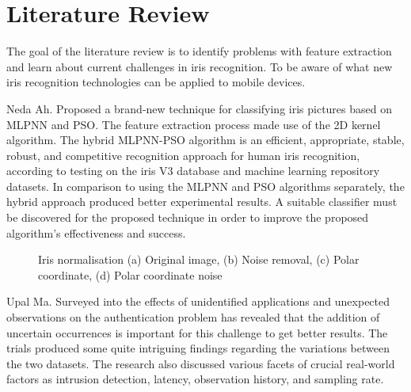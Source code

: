 \documentclass[9pt,twocolumn,twoside]{osajnl}
\begin{document}
\section{Literature Review}
The goal of the literature review is to identify problems with feature extraction and learn about current challenges in iris recognition. To be aware of what new iris recognition technologies can be applied to mobile devices.

Neda Ah. \cite{Chitimalla:17} Proposed a brand-new technique for classifying iris pictures based on MLPNN and PSO. The feature extraction process made use of the 2D kernel algorithm. The hybrid MLPNN-PSO algorithm is an efficient, appropriate, stable, robust, and competitive recognition approach for human iris recognition, according to testing on the iris V3 database and machine learning repository datasets. In comparison to using the MLPNN and PSO algorithms separately, the hybrid approach produced better experimental results. A suitable classifier must be discovered for the proposed technique in order to improve the proposed algorithm's effectiveness and success.

\begin{figure}[htbp]
\centering
{}
\caption{Iris normalisation (a) Original image, (b) Noise removal, (c) Polar coordinate, (d) Polar coordinate noise}
\label{fig:Iris normalisation}
\end{figure}

Upal Ma. \cite{Wen:16} Surveyed into the effects of unidentified applications and unexpected observations on the authentication problem has revealed that the addition of uncertain occurrences is important for this challenge to get better results. The trials produced some quite intriguing findings regarding the variations between the two datasets. The research also discussed various facets of crucial real-world factors as intrusion detection, latency, observation history, and sampling rate.
\end{document}
